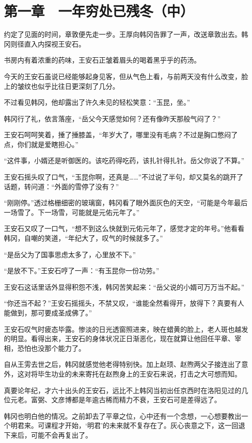 \section{第一章　一年穷处已残冬（中）}

约定了见面的时间，章敦便先走一步。王厚向韩冈告罪了一声，改送章敦出去。韩冈则径直入内探视王安石。

书房内有着浓重的药味，王安石正皱着眉头的喝着黑乎乎的药汤。

今天的王安石虽说已经能够起身见客，但从气色上看，与前两天没有什么改变，脸上的皱纹也似乎比往日更深刻了几分。

不过看见韩冈，他却露出了许久未见的轻松笑意：“玉昆，坐。”

韩冈行了礼，依言落座，“岳父今天感觉如何？还有像昨天那般气闷了？”

王安石呵呵笑着，捶了捶膝盖，“年岁大了，哪里没有毛病？不过是胸口憋闷了点，你们就是爱瞎担心。”

“这件事，小婿还是听御医的。该吃药得吃药，该扎针得扎针。岳父你说了不算。”

王安石摇头叹了口气，“玉昆你啊，还真是……”不过说了半句，却又莫名的跳开了话题，转问道：“外面的雪停了没有？”

“刚刚停。”透过格栅细密的玻璃窗，韩冈看了眼外面灰色的天空，“可能是今年最后一场雪了。下一场雪，可能就是元佑元年了。”

王安石又叹了一口气，“想不到这么快就到元佑元年了，感觉才定的年号。”他看看韩冈，自嘲的笑道，“年纪大了，叹气的时候就多了。”

“是岳父为了国事思虑太多了，心里放不下。”

“是放不下。”王安石哼了一声：“有玉昆你一份功劳。”

王安石这话里话外显得积怨不浅，韩冈苦笑起来：“岳父说的小婿可万万当不起。”

“你还当不起？”王安石摇摇头，不禁又叹，“谁能全然看得开，放得下？真要有人能做到，那可要成圣成佛了。”

王安石叹气时疲态毕露。惨淡的日光透窗照进来，映在蜡黄的脸上，老人斑也越发的明显。看得出来，王安石的身体状况正日渐恶化，现在就算让他回任平章、宰相，恐怕也没那个能力了。

自从王雱去世之后，韩冈就感觉他老得特别快。加上赵顼、赵煦两父子接连出了意外，这对将毕生功业的未来寄托在赵煦身上的王安石来说，打击之大可想而知。

真要论年纪，才六十出头的王安石，远比不上韩冈当初出任京西时在洛阳见过的几位元老。富弼、文彦博都是年逾古稀而精力不衰，王安石可是差得远了。

韩冈也明白他的情况。之前卸去了平章之位，心中还有一个念想，一心想要教出一个明君来。可课程才开始，‘明君’的未来就不复存在了。灰心丧意之下，这一回退下来后，可能不会再复出了。


